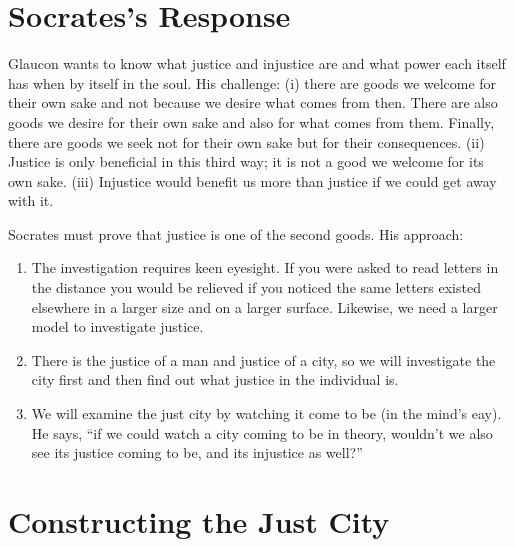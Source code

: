 \documentclass[oneside]{article}
\begin{document}
\thispagestyle{fancy}

\section*{Socrates's Response}

Glaucon wants to know what justice and injustice are and what power each itself has when by itself in the soul. His challenge: (i) there are goods we welcome for their own sake and not because we desire what comes from then. There are also goods we desire for their own sake and also for what comes from them. Finally, there are goods we seek not for their own sake but for their consequences. (ii) Justice is only beneficial in this third way; it is not a good we welcome for its own sake. (iii)  Injustice would benefit us more than justice if we could get away with it. 

Socrates must prove that justice is one of the second goods. His approach: 

\begin{enumerate}
\item The investigation requires keen eyesight. If you were asked to read letters in the distance you would be relieved if you noticed the same letters existed elsewhere in a larger size and on a larger surface. Likewise, we need a larger model to investigate justice. 
\item There is the justice of a man and justice of a city, so we will investigate the city first and then find out what justice in the individual is. 
\item We will examine the just city by watching it come to be (in the mind's eay). He says, ``if we could watch a city coming to be in theory, wouldn't we also see its justice coming to be, and its injustice as well?''
\end{enumerate}

\section*{Constructing the Just City}
\end{document}
